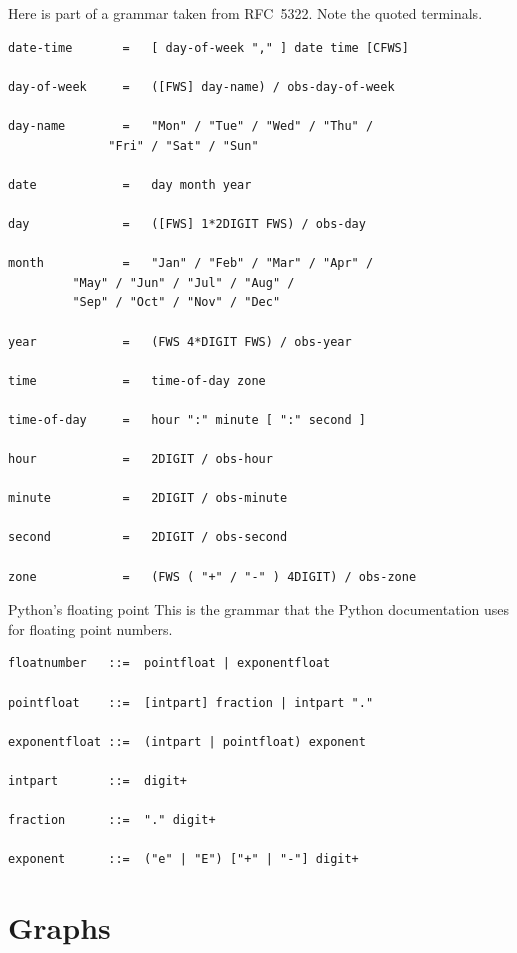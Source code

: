 \documentclass[9pt,t,serif,professionalfont,xcolor={table,dvipsnames},noamsthm]{beamer}
\begin{document}
\begin{frame}[fragile]
Here is part of a grammar
taken from RFC~5322.
Note the quoted terminals.
\begin{lstlisting}
date-time       =   [ day-of-week "," ] date time [CFWS]

day-of-week     =   ([FWS] day-name) / obs-day-of-week

day-name        =   "Mon" / "Tue" / "Wed" / "Thu" /
              "Fri" / "Sat" / "Sun"

date            =   day month year

day             =   ([FWS] 1*2DIGIT FWS) / obs-day

month           =   "Jan" / "Feb" / "Mar" / "Apr" /
         "May" / "Jun" / "Jul" / "Aug" /
         "Sep" / "Oct" / "Nov" / "Dec"

year            =   (FWS 4*DIGIT FWS) / obs-year
 
time            =   time-of-day zone

time-of-day     =   hour ":" minute [ ":" second ]

hour            =   2DIGIT / obs-hour

minute          =   2DIGIT / obs-minute

second          =   2DIGIT / obs-second

zone            =   (FWS ( "+" / "-" ) 4DIGIT) / obs-zone
\end{lstlisting}
\end{frame}


\begin{frame}[fragile]{Python's floating point}
This is the grammar that the Python documentation uses
for floating point numbers.
\begin{lstlisting}
floatnumber   ::=  pointfloat | exponentfloat

pointfloat    ::=  [intpart] fraction | intpart "."

exponentfloat ::=  (intpart | pointfloat) exponent

intpart       ::=  digit+

fraction      ::=  "." digit+

exponent      ::=  ("e" | "E") ["+" | "-"] digit+
\end{lstlisting}
\end{frame}




\section{Graphs}
\end{document}
